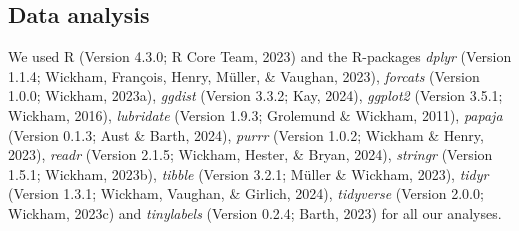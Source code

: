 \documentclass[
  man,floatsintext]{apa6}
\begin{document}
\newpage

\subsection{Data analysis}\label{data-analysis}

We used R (Version 4.3.0; R Core Team, 2023) and the R-packages \emph{dplyr} (Version 1.1.4; Wickham, François, Henry, Müller, \& Vaughan, 2023), \emph{forcats} (Version 1.0.0; Wickham, 2023a), \emph{ggdist} (Version 3.3.2; Kay, 2024), \emph{ggplot2} (Version 3.5.1; Wickham, 2016), \emph{lubridate} (Version 1.9.3; Grolemund \& Wickham, 2011), \emph{papaja} (Version 0.1.3; Aust \& Barth, 2024), \emph{purrr} (Version 1.0.2; Wickham \& Henry, 2023), \emph{readr} (Version 2.1.5; Wickham, Hester, \& Bryan, 2024), \emph{stringr} (Version 1.5.1; Wickham, 2023b), \emph{tibble} (Version 3.2.1; Müller \& Wickham, 2023), \emph{tidyr} (Version 1.3.1; Wickham, Vaughan, \& Girlich, 2024), \emph{tidyverse} (Version 2.0.0; Wickham, 2023c) and \emph{tinylabels} (Version 0.2.4; Barth, 2023) for all our analyses.

\newpage
\end{document}
